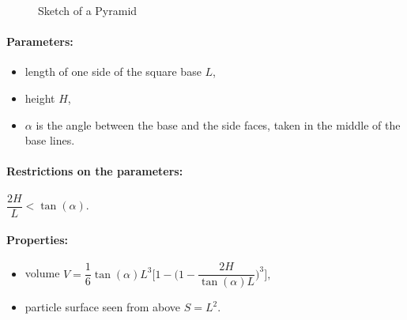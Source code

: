 \begin{figure}[ht]
\hfill
{}
\hfill
{}
\hfill
\caption{Sketch of a Pyramid}
\label{fig:pyramid}
\end{figure}

\FloatBarrier

\paragraph{Parameters:}
\begin{itemize}
\item length of one side of the square base $L$,  
\item height $H$,
\item  $\alpha$ is the angle between the base and the
  side faces, taken in the middle of the base lines.
\end{itemize}

\paragraph{Restrictions on the parameters:} $\dfrac{2H}{L} < \tan(\alpha)$.

\paragraph{Properties:}
\begin{itemize}
\item  volume $V = \dfrac{1}{6} \tan(\alpha) L^3\Big[ 1
             - \big(1 - \dfrac{2H}{\tan(\alpha)L}\big)^3 \Big],$
\item particle surface seen from above $S = L^2$.
\end{itemize}

